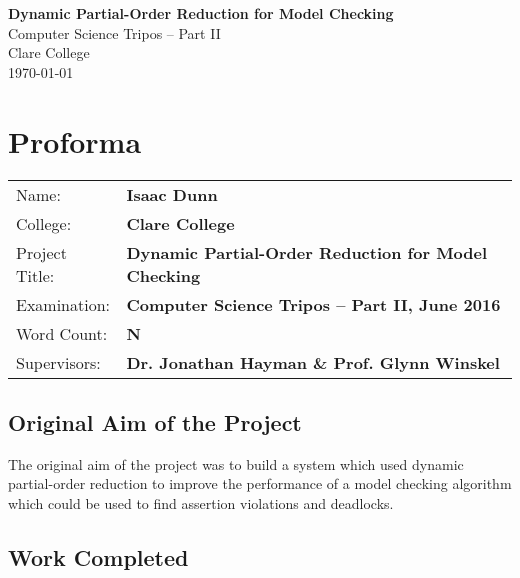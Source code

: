 \documentclass[12pt,a4paper,twoside,openright]{report}
\begin{document}





\pagestyle{empty}


\vspace*{60mm}
\begin{center}
\Huge
\textbf{Dynamic Partial-Order Reduction for Model Checking} \\[5mm]
Computer Science Tripos -- Part II \\[5mm]
Clare College \\[5mm]
\today  %
\end{center}


\pagestyle{plain}

\chapter*{Proforma}

{\large
\begin{tabular}{ll}
Name:           & \bf Isaac Dunn                            			 \\
College:        & \bf Clare College                    				     \\
Project Title:	& \bf Dynamic Partial-Order Reduction for Model Checking \\
Examination:    & \bf Computer Science Tripos -- Part II, June 2016      \\
Word Count:     & \bf N    \\
Supervisors:	& \bf Dr. Jonathan Hayman \& Prof. Glynn Winskel             \\ 
\end{tabular}
}


\section*{Original Aim of the Project}

The original aim of the project was to build a system which
used dynamic partial-order reduction to improve the performance
of a model checking algorithm which could be used to find
assertion violations and deadlocks.

\section*{Work Completed}
\end{document}
